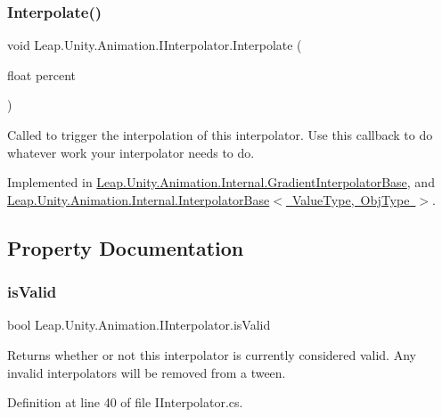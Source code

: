 \subsubsection{\texorpdfstring{Interpolate()}{Interpolate()}}
{\footnotesize\ttfamily void Leap.\+Unity.\+Animation.\+I\+Interpolator.\+Interpolate (\begin{DoxyParamCaption}\item[{float}]{percent }\end{DoxyParamCaption})}



Called to trigger the interpolation of this interpolator. Use this callback to do whatever work your interpolator needs to do. 



Implemented in \mbox{\hyperlink{class_leap_1_1_unity_1_1_animation_1_1_internal_1_1_gradient_interpolator_base_a21af3d1e1373cd6c18a4342952220873}{Leap.\+Unity.\+Animation.\+Internal.\+Gradient\+Interpolator\+Base}}, and \mbox{\hyperlink{class_leap_1_1_unity_1_1_animation_1_1_internal_1_1_interpolator_base_acd571d432a4896887739026e3f9fd936}{Leap.\+Unity.\+Animation.\+Internal.\+Interpolator\+Base$<$ Value\+Type, Obj\+Type $>$}}.



\subsection{Property Documentation}
\mbox{\label{interface_leap_1_1_unity_1_1_animation_1_1_i_interpolator_a0cf0a3c8d78b1baa20dc9702b0a5d264}} 
\subsubsection{\texorpdfstring{isValid}{isValid}}
{\footnotesize\ttfamily bool Leap.\+Unity.\+Animation.\+I\+Interpolator.\+is\+Valid\hspace{0.3cm}{\ttfamily [get]}}



Returns whether or not this interpolator is currently considered valid. Any invalid interpolators will be removed from a tween. 



Definition at line 40 of file I\+Interpolator.\+cs.

